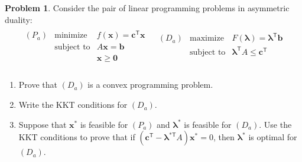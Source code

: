 \documentclass[12pt]{article}
\theoremstyle{definition}
\newtheorem{problem}{Problem}
\newcommand{\vc}[1]{\boldsymbol{#1}}
\newcommand{\tran}{\mathsf{T}}
\begin{document}
\begin{problem}
  Consider the pair of linear programming problems in asymmetric duality:
  \begin{align*}
    \begin{array}{ll}
      \begin{array}{rrl}
        (P_a) & \text{minimize} & f(\vc{x}) = \vc{c}^\tran\vc{x} \\
        & \text{subject to} & A\vc{x} = \vc{b} \\
        & & \vc{x} \geq \vc{0} \\
      \end{array}
      &
      \begin{array}{rrl}
        (D_a) & \text{maximize} & F(\vc{\lambda}) = \vc{\lambda}^\tran\vc{b} \\
        & \text{subject to} & \vc{\lambda}^\tran A \leq \vc{c}^\tran \\
        & & \\
      \end{array}
    \end{array}
  \end{align*}
  \begin{enumerate}
    \item Prove that $(D_a)$ is a convex programming problem.
    \item Write the KKT conditions for $(D_a)$.
    \item Suppose that $\vc{x}^*$ is feasible for $(P_a)$ and $\vc{\lambda}^*$ is
      feasible for $(D_a)$. Use the KKT conditions to prove that if $(\vc{c}^\tran - \vc{\lambda}^{*\tran}A)\vc{x}^* = 0$,
      then $\vc{\lambda}^*$ is optimal for $(D_a)$.
  \end{enumerate}
\end{problem}
\end{document}
